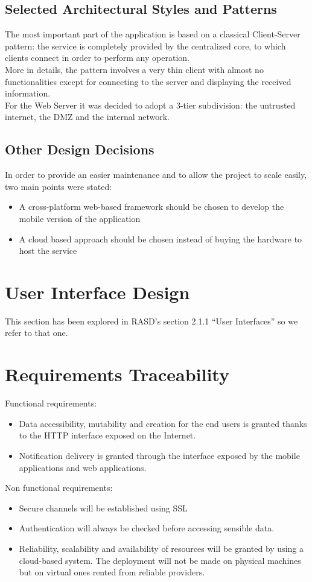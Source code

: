 \documentclass{article}
\begin{document}
	\subsection{Selected Architectural Styles and Patterns}
	The most important part of the application is based on a classical Client-Server pattern: the service is completely provided by the centralized core, to which clients connect in order to perform any operation.\\
	More in details, the pattern involves a very thin client with almost no functionalities except for connecting to the server and displaying the received information.\\
	For the Web Server it was decided to adopt a 3-tier subdivision: the untrusted internet, the DMZ and the internal network.
	\subsection{Other Design Decisions}
	In order to provide an easier maintenance and to allow the project to scale easily, two main points were stated: 
	\begin{itemize}
		\item A cross-platform web-based framework should be chosen to develop the mobile version of the application 
		\item A cloud based approach should be chosen instead of buying the hardware to host the service
	\end{itemize}
	
	\section{User Interface Design}
	This section has been explored in RASD's section 2.1.1 ``User Interfaces'' so we refer to that one.
	
	\section{Requirements Traceability}
	Functional requirements:
	\begin{itemize}
		\item Data accessibility, mutability and creation for the end users is granted thanks to the HTTP interface exposed on the Internet.
		\item Notification delivery is granted through the interface exposed by the mobile applications and web applications.
	\end{itemize}
	Non functional requirements:
	\begin{itemize}
		\item Secure channels will be established using SSL 
		\item Authentication will always be checked before accessing sensible data.
		\item Reliability, scalability and availability of resources will be granted by using a cloud-based system. The deployment will not be made on physical machines but on virtual ones rented from reliable providers.
	\end{itemize}
\end{document}
